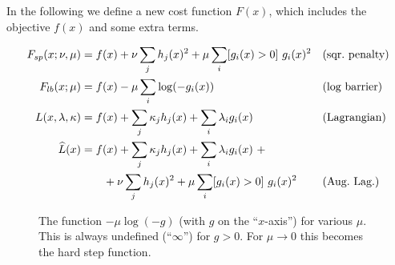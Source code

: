 In the following we define a new cost function $F(x)$, which includes
the objective $f(x)$ and some extra terms.
\begin{myDefinition}
\begin{align*}
F_{sp}(x;\nu,\mu) &= f(x) + \nu \sum_j h_j(x)^2 + \mu \sum_i [g_i(x)>0]~ g_i(x)^2&& \text{(sqr.\ penalty)}\\
F_{lb}(x;\mu) &= f(x) - \mu \sum_i \log(-g_i(x)) && \text{(log barrier)}\\
L(x,\lambda,\kappa) &= f(x) + \sum_j \kappa_j h_j(x) + \sum_i \lambda_i g_i(x) && \text{(Lagrangian)} \\
\widehat L(x) &= f(x) + \sum_j \kappa_j h_j(x) + \sum_i \lambda_i g_i(x) ~+ \\
&\qquad + \nu\sum_j h_j(x)^2 + \mu \sum_i [g_i(x)>0]~ g_i(x)^2 && \text{(Aug.\ Lag.)}\nonumber
\end{align*}
\end{myDefinition}

\begin{figure}
\caption{\label{figLogBarriers}
The function $-\mu\log(-g)$ (with $g$ on the ``$x$-axis'')
for various $\mu$. This is always undefined (``$\infty$'') for
$g>0$. For $\mu\to 0$ this becomes the hard step function.}
\end{figure}

